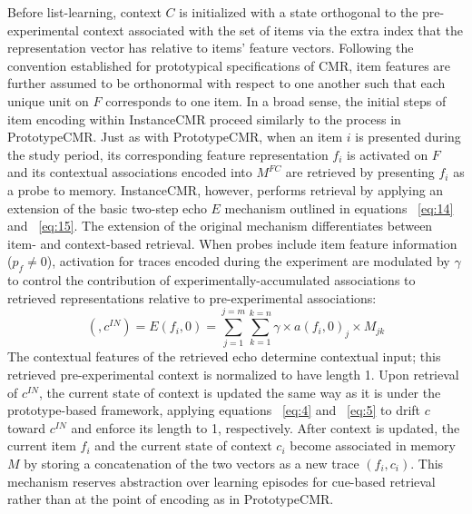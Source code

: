 {}Before list-learning, context $C$ is initialized with a state orthogonal to the pre-experimental context associated with the set of items via the extra index that the representation vector has relative to items’ feature vectors. Following the convention established for prototypical specifications of CMR, item features are further assumed to be orthonormal with respect to one another such that each unique unit on $F$ corresponds to one item.\markdownRendererInterblockSeparator
{}\markdownRendererInterblockSeparator
{}In a broad sense, the initial steps of item encoding within InstanceCMR proceed similarly to the process in PrototypeCMR. Just as with PrototypeCMR, when an item $i$ is presented during the study period, its corresponding feature representation $f_i$ is activated on $F$ and its contextual associations encoded into $M^{FC}$ are retrieved by presenting $f_i$ as a probe to memory. InstanceCMR, however, performs retrieval by applying an extension of the basic two-step echo $E$ mechanism outlined in equations ~\ref{eq:14} and ~\ref{eq:15}. \markdownRendererInterblockSeparator
{}The extension of the original mechanism differentiates between item- and context-based retrieval. When probes include item feature information ($p_f \neq 0$), activation for traces encoded during the experiment are modulated by $\gamma$ to control the contribution of experimentally-accumulated associations to retrieved representations relative to pre-experimental associations:\markdownRendererInterblockSeparator
{}\begin{equation} \label{eq:19} (, c^{IN}) = E(f_i, 0) = \sum^{j=m}_{j=1}\sum^{k=n}_{k=1} {\gamma} \times a(f_i, 0)_j \times M_{jk} \end{equation}\markdownRendererInterblockSeparator
{}The contextual features of the retrieved echo determine contextual input; this retrieved pre-experimental context is normalized to have length 1. Upon retrieval of $c^{IN}$, the current state of context is updated the same way as it is under the prototype-based framework, applying equations ~\ref{eq:4} and ~\ref{eq:5} to drift $c$ toward $c^{IN}$ and enforce its length to 1, respectively.\markdownRendererInterblockSeparator
{}After context is updated, the current item $f_i$ and the current state of context $c_i$ become associated in memory $M$ by storing a concatenation of the two vectors as a new trace $(f_i, c_i)$. This mechanism reserves abstraction over learning episodes for cue-based retrieval rather than at the point of encoding as in PrototypeCMR.\markdownRendererInterblockSeparator
